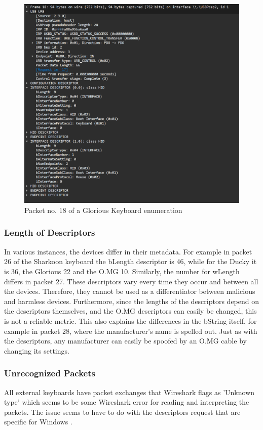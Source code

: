 \begin{figure}[H]
    \centering
    \includegraphics[width=0.75\linewidth]{visuals/packet18glorious.png}
    \caption{Packet no. 18 of a Glorious Keyboard enumeration}
    \label{fig:packet18Glorious}
\end{figure}

\subsubsection{Length of Descriptors}

In various instances, the devices differ in their metadata. For example in packet 26 of the Sharkoon keyboard the bLength descriptor is 46, while for the Ducky it is 36, the Glorious 22 and the O.MG 10. Similarly, the number for wLength differs in packet 27. These descriptors vary every time they occur and between all the devices. Therefore, they cannot be used as a differentiator between malicious and harmless devices. Furthermore, since the lengths of the descriptors depend on the descriptors themselves, and the O.MG descriptors can easily be changed, this is not a reliable metric.
This also explains the differences in the bString itself, for example in packet 28, where the manufacturer's name is spelled out. Just as with the descriptors, any manufacturer can easily be spoofed by an O.MG cable by changing its settings. 


\subsubsection{Unrecognized Packets}

All external keyboards have packet exchanges that Wireshark flags as 'Unknown type' which seems to be some Wireshark error for reading and interpreting the packets. The issue seems to have to do with the descriptors request that are specific for Windows \cite{USBPcapDidNot}.

